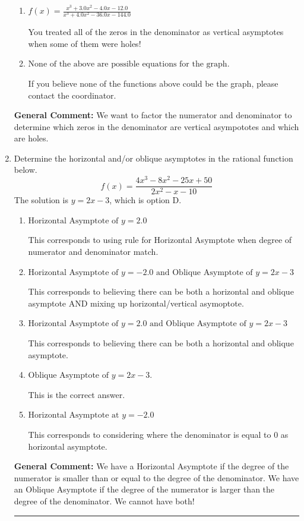 \documentclass{extbook}[14pt]
\newcommand{\litem}[1]{\item #1

\rule{\textwidth}{0.4pt}}
\begin{document}
\begin{enumerate}
{\begin{enumerate}[label=\Alph*.]
This is the correct answer!
\item \( f(x)=\frac{x^{3} +3.0 x^{2} -4.0 x -12.0}{x^{3} +4.0 x^{2} -36.0 x -144.0} \)

You treated all of the zeros in the denominator as vertical asymptotes when some of them were holes!
\item \( \text{None of the above are possible equations for the graph.} \)

If you believe none of the functions above could be the graph, please contact the coordinator.
\end{enumerate}

\textbf{General Comment:} We want to factor the numerator and denominator to determine which zeros in the denominator are vertical asympototes and which are holes.
}
\litem{
Determine the horizontal and/or oblique asymptotes in the rational function below.
\[ f(x) = \frac{4x^{3} -8 x^{2} -25 x + 50}{2x^{2} -x -10} \]The solution is \( y = 2x -3 \), which is option D.\begin{enumerate}[label=\Alph*.]
\item \( \text{Horizontal Asymptote of } y = 2.0  \)

This corresponds to using rule for Horizontal Asymptote when degree of numerator and denominator match.
\item \( \text{Horizontal Asymptote of } y = -2.0 \text{ and Oblique Asymptote of } y = 2x -3 \)

This corresponds to believing there can be both a horizontal and oblique asymptote AND mixing up horizontal/vertical asymoptote.
\item \( \text{Horizontal Asymptote of } y = 2.0 \text{ and Oblique Asymptote of } y = 2x -3 \)

This corresponds to believing there can be both a horizontal and oblique asymptote.
\item \( \text{Oblique Asymptote of } y = 2x -3. \)

This is the correct answer.
\item \( \text{Horizontal Asymptote at } y = -2.0 \)

This corresponds to considering where the denominator is equal to 0 as horizontal asymptote.
\end{enumerate}

\textbf{General Comment:} We have a Horizontal Asymptote if the degree of the numerator is smaller than or equal to the degree of the denominator. We have an Oblique Asymptote if the degree of the numerator is larger than the degree of the denominator. We cannot have both!
}
\end{enumerate}
\end{document}
